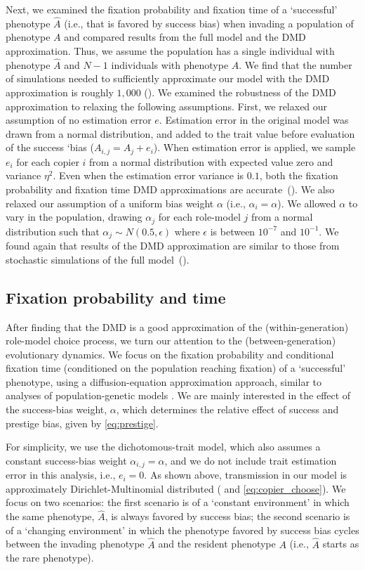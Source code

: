 \documentclass[12pt]{extarticle}
\begin{document}
Next, we examined the fixation probability and fixation time of a `successful' phenotype $\hat{A}$ (i.e., that is favored by success bias) when invading a population of phenotype $A$ and compared results from the full model and the DMD approximation.
Thus, we assume the population has a single individual with phenotype $\hat{A}$ and $N-1$ individuals with phenotype $A$. 
We find that the number of simulations needed to sufficiently approximate our model with the DMD approximation is roughly $1,000$ ().
We examined the robustness of the DMD approximation to relaxing the following assumptions.
First, we relaxed our assumption of no estimation error $e$.
Estimation error in the original model was drawn from a normal distribution, and added to the trait value before evaluation of the success `bias ($A_{i,j} = A_j + e_i$).
When estimation error is applied, we sample $e_i$ for each copier $i$ from a normal distribution with expected value zero and variance $\eta^2$.
Even when the estimation error variance is $0.1$, both the fixation probability and fixation time DMD approximations are accurate~(). 
We also relaxed our assumption of a uniform bias weight $\alpha$ (i.e., $\alpha_i=\alpha$). We allowed $\alpha$ to vary in the population, drawing $\alpha_j$ for each role-model $j$ from a normal distribution such that $\alpha_j \sim N(0.5, \epsilon)$ where $\epsilon$ is between $10^{-7}$ and $10^{-1}$. 
We found again that results of the DMD approximation are similar to those from stochastic simulations of the full model~().


\subsection*{Fixation probability and time}
After finding that the DMD is a good approximation of the (within-generation) role-model choice process, we turn our attention to the (between-generation) evolutionary dynamics.
We focus on the fixation probability and conditional fixation time (conditioned on the population reaching fixation) of a `successful' phenotype, using a diffusion-equation approximation approach, similar to analyses of population-genetic models \citep{kimura,kimura_average,otto_fixation}.
We are mainly interested in the effect of the success-bias weight, $\alpha$, which determines the relative effect of success and prestige bias, given by \cref{eq:prestige}.

For simplicity, we use the dichotomous-trait model, which also assumes a constant success-bias weight $\alpha_{i,j}=\alpha$, and we do not include trait estimation error in this analysis, i.e., $e_i=0$.
As shown above, transmission in our model is approximately Dirichlet-Multinomial distributed ( and \cref{eq:copier_choose}).
We focus on two scenarios: the first scenario is of a `constant environment' in which the same phenotype, $\hat{A}$, is always favored by success bias; the second scenario is of a `changing environment' in which the phenotype favored by success bias cycles between the invading phenotype $\hat{A}$ and the resident phenotype $A$ (i.e., $\hat{A}$ starts as the rare phenotype).
\end{document}
